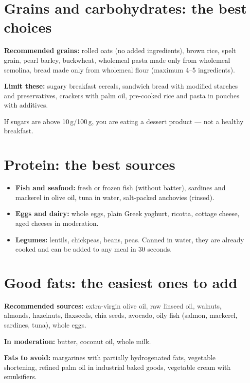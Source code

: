 \documentclass[a5paper,12pt,oneside,openany]{book}
\newcommand{\boxinfo}[2]{%
  \begin{tcolorbox}[boxbase,
    colback=infoBlue!8!white, colframe=infoBlue, title={#1}]
  #2\end{tcolorbox}}
\begin{document}
\section{Grains and carbohydrates: the best choices}

\textbf{Recommended grains:} rolled oats (no added ingredients), brown
rice, spelt grain, pearl barley, buckwheat, wholemeal pasta made only
from wholemeal semolina, bread made only from wholemeal flour (maximum
4--5 ingredients).

\textbf{Limit these:} sugary breakfast cereals, sandwich bread with
modified starches and preservatives, crackers with palm oil, pre-cooked
rice and pasta in pouches with additives.

\boxinfo{Quick tip for breakfast cereals}{If sugars are above 10\,g/100\,g,
you are eating a dessert product --- not a healthy breakfast.}

\section{Protein: the best sources}

\begin{itemize}
  \item \textbf{Fish and seafood:} fresh or frozen fish (without batter),
    sardines and mackerel in olive oil, tuna in water, salt-packed
    anchovies (rinsed).
  \item \textbf{Eggs and dairy:} whole eggs, plain Greek yoghurt, ricotta,
    cottage cheese, aged cheeses in moderation.
  \item \textbf{Legumes:} lentils, chickpeas, beans, peas. Canned in
    water, they are already cooked and can be added to any meal in 30
    seconds.
\end{itemize}

\section{Good fats: the easiest ones to add}

\textbf{Recommended sources:} extra-virgin olive oil, raw linseed oil,
walnuts, almonds, hazelnuts, flaxseeds, chia seeds, avocado, oily fish
(salmon, mackerel, sardines, tuna), whole eggs.

\textbf{In moderation:} butter, coconut oil, whole milk.

\textbf{Fats to avoid:} margarines with partially hydrogenated fats,
vegetable shortening, refined palm oil in industrial baked goods, vegetable
cream with emulsifiers.
\end{document}
